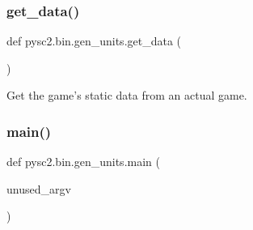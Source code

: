 \subsubsection{\texorpdfstring{get\+\_\+data()}{get\_data()}}
{\footnotesize\ttfamily def pysc2.\+bin.\+gen\+\_\+units.\+get\+\_\+data (\begin{DoxyParamCaption}{ }\end{DoxyParamCaption})}

\begin{DoxyVerb}Get the game's static data from an actual game.\end{DoxyVerb}
 \mbox{\label{namespacepysc2_1_1bin_1_1gen__units_acb19fa96257021a40f623e714885428f}} 
\subsubsection{\texorpdfstring{main()}{main()}}
{\footnotesize\ttfamily def pysc2.\+bin.\+gen\+\_\+units.\+main (\begin{DoxyParamCaption}\item[{}]{unused\+\_\+argv }\end{DoxyParamCaption})}

